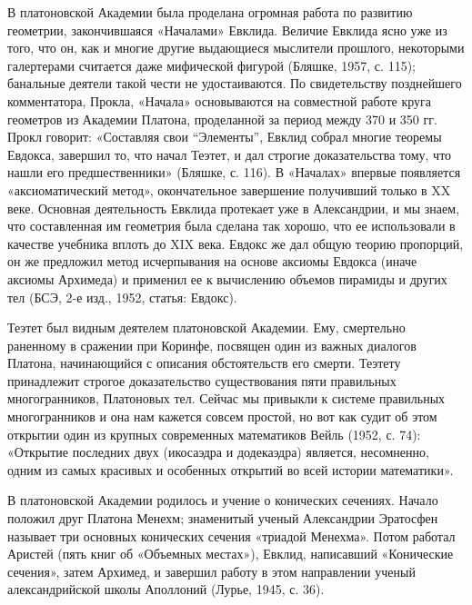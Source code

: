 В платоновской Академии была проделана огромная работа по развитию
геометрии, закончившаяся «Началами» Евклида. Величие Евклида ясно уже
из того, что он, как и многие другие выдающиеся мыслители прошлого,
некоторыми галертерами считается даже мифической фигурой (Бляшке,
1957, с. 115); банальные деятели такой чести не удостаиваются. По
свидетельству позднейшего комментатора, Прокла, «Начала» основываются
на совместной работе круга геометров из Академии Платона, проделанной
за период между 370 и 350 гг. Прокл говорит: «Составляя свои
``Элементы'', Евклид собрал многие теоремы Евдокса, завершил то, что
начал Теэтет, и дал строгие доказательства тому, что нашли его
предшественники» (Бляшке, с. 116). В «Началах» впервые появляется
«аксиоматический метод», окончательное завершение получивший только в
XX веке. Основная деятельность Евклида протекает уже в Александрии, и
мы знаем, что составленная им геометрия была сделана так хорошо, что
ее использовали в качестве учебника вплоть до XIX века. Евдокс же дал
общую теорию пропорций, он же предложил метод исчерпывания на основе
аксиомы Евдокса (иначе аксиомы Архимеда) и применил ее к вычислению
объемов пирамиды и других тел (БСЭ, 2-е изд., 1952, статья: Евдокс).

Теэтет был видным деятелем платоновской Академии. Ему, смертельно
раненному в сражении при Коринфе, посвящен один из важных диалогов
Платона, начинающийся с описания обстоятельств его смерти. Теэтету
принадлежит строгое доказательство существования пяти правильных
многогранников, Платоновых тел. Сейчас мы привыкли к системе
правильных многогранников и она нам кажется совсем простой, но вот как
судит об этом открытии один из крупных современных математиков Вейль
(1952, с. 74): «Открытие последних двух (икосаэдра и додекаэдра)
является, несомненно, одним из самых красивых и особенных открытий во
всей истории математики».

В платоновской Академии родилось и учение о конических сечениях.
Начало положил друг Платона Менехм; знаменитый ученый Александрии
Эратосфен называет три основных конических сечения «триадой Менехма».
Потом работал Аристей (пять книг об «Объемных местах»), Евклид,
написавший «Конические сечения», затем Архимед, и завершил работу в
этом направлении ученый александрийской школы Аполлоний (Лурье, 1945,
с. 36).


